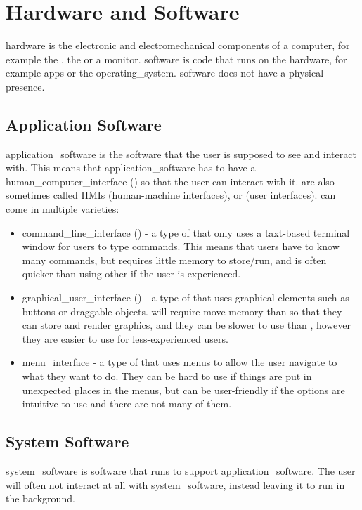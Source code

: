 \section{Hardware and Software} \label{hardware_and_software}
    \Gls{hardware} is the electronic and electromechanical components of a computer, for example the \acroCPU, the \acroRAM or a monitor.
    \Gls{software} is code that runs on the \gls{hardware}, for example apps or the \gls{operating_system}.
    \Gls{software} does not have a physical presence.

    \subsection{Application Software}
        \Gls{application_software} is the \gls{software} that the user is supposed to see and interact with.
        This means that \gls{application_software} has to have a \gls{human_computer_interface} (\acroHCI) so that the user can interact with it.
        \acroplHCI are also sometimes called HMIs (human-machine interfaces), or \acroplUI (user interfaces).
        \acroplHCI can come in multiple varieties:
        \begin{itemize}
            \item \Gls{command_line_interface} (\acroCLI) - a type of \acroUI that only uses a taxt-based terminal window for users to type commands.
            This means that users have to know many commands, but requires little memory to store/run, and is often quicker than using other \acroplUI if the user is experienced.
            \item \Gls{graphical_user_interface} (\acroGUI) - a type of \acroUI that uses graphical elements such as buttons or draggable objects.
            \acroplGUI will require move memory than \acroplCLI so that they can store and render graphics, and they can be slower to use than \acroplCLI, however they are easier to use for less-experienced users.
            \item \Gls{menu_interface} - a type of \acroUI that uses menus to allow the user navigate to what they want to do.
            They can be hard to use if things are put in unexpected places in the menus, but can be user-friendly if the options are intuitive to use and there are not many of them.
        \end{itemize}

    \subsection{System Software}
        \Gls{system_software} is \gls{software} that runs to support \gls{application_software}.
        The user will often not interact at all with \gls{system_software}, instead leaving it to run in the background.

